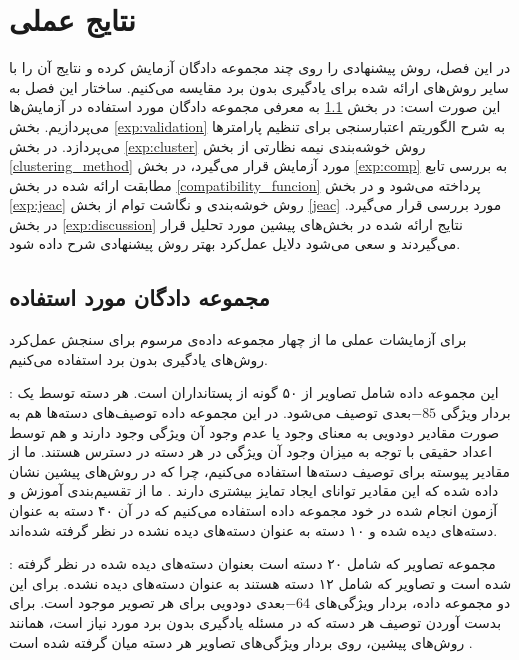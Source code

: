\chapter{نتایج عملی} \label{chap:experiments}
در این فصل، روش پیشنهادی را روی چند مجموعه دادگان آزمایش کرده و نتایج آن را با سایر روش‌های ارائه شده برای یادگیری بدون برد مقایسه می‌کنیم. ساختار این فصل به این صورت است:
 در بخش \ref{exp:datasets} به معرفی مجموعه دادگان مورد استفاده در آزمایش‌ها می‌پردازیم.
بخش \ref{exp:validation} به شرح الگوریتم اعتبارسنجی برای تنظیم پارامترها می‌پردازد.
 در بخش \ref{exp:cluster} روش خوشه‌بندی نیمه نظارتی از بخش \ref{clustering_method} مورد آزمایش قرار می‌گیرد،
  در بخش \ref{exp:comp} به بررسی تابع مطابقت ارائه شده  در بخش \ref{compatibility_funcion} پرداخته می‌شود
   و در بخش \ref{exp:jeac} روش خوشه‌بندی و نگاشت توام از بخش \ref{jeac} مورد بررسی قرار می‌گیرد.
    در بخش \ref{exp:discussion} نتایج ارائه شده در بخش‌های پیشین مورد تحلیل قرار می‌گیردند و سعی می‌شود دلایل عمل‌کرد بهتر روش پیشنهادی شرح داده شود.


\section{مجموعه دادگان مورد استفاده}\label{exp:datasets}
برای آزمایشات عملی ما از چهار مجموعه داده‌ی مرسوم برای سنجش عمل‌کرد روش‌های یادگیری بدون برد استفاده می‌کنیم.

\textbf{} \cite{lampert09}:
این مجموعه داده شامل تصاویر از ۵۰ گونه از پستانداران است. هر دسته توسط یک بردار ویژگی $-85$بعدی توصیف می‌شود. در این مجموعه داده توصیف‌های دسته‌ها هم به صورت مقادیر دودویی به معنای وجود یا عدم وجود آن ویژگی وجود دارند و هم توسط اعداد حقیقی با توجه به میزان وجود آن ویژگی در هر دسته در دسترس هستند. ما از مقادیر پیوسته برای توصیف دسته‌ها استفاده می‌کنیم، چرا که در روش‌های پیشین نشان داده شده که این مقادیر توانای ایجاد تمایز بیشتری دارند \cite{Akata2015}. ما از تقسیم‌بندی آموزش و آزمون انجام شده در خود مجموعه داده استفاده می‌کنیم که در آن ۴۰ دسته به عنوان دسته‌های دیده شده و ۱۰ دسته به عنوان
دسته‌های دیده نشده در نظر گرفته شده‌اند.

\textbf{}\cite{farhadi09}:
مجموعه تصاویر
  \cite{pascal}
 که شامل ۲۰ دسته است بعنوان دسته‌های دیده شده در نظر گرفته شده است و تصاویر  که شامل ۱۲ دسته هستند به عنوان دسته‌های دیده نشده. برای این دو مجموعه داده، بردار ویژگی‌های $-64$بعدی دودویی برای هر تصویر موجود است. برای بدست آوردن توصیف هر دسته که در مسئله یادگیری بدون برد مورد نیاز است، همانند روش‌های پیشین، روی بردار ویژگی‌های تصاویر هر دسته میان گرفته
 شده است  \cite{lampert09}.


